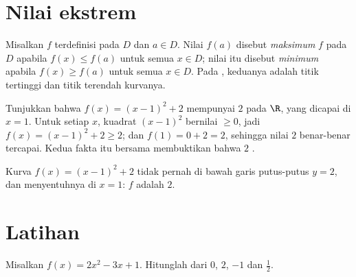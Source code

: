 \section{Nilai ekstrem}

\begin{definition}\label{def:g10:functions:extrema}
Misalkan $f$ terdefinisi pada $D$ dan $a \in D$. Nilai $f(a)$ disebut
\emph{maksimum} $f$ pada $D$ apabila $f(x) \leq f(a)$ untuk
semua $x \in D$; nilai itu disebut \emph{minimum} apabila
$f(x) \geq f(a)$ untuk semua $x \in D$. Pada , keduanya adalah titik
tertinggi dan titik terendah kurvanya.
\end{definition}

\begin{example}\label{ex:g10:functions:extremum}
Tunjukkan bahwa $f(x) = (x - 1)^2 + 2$ mempunyai  $2$ pada $\R$, yang
dicapai di $x = 1$. Untuk setiap $x$, kuadrat $(x-1)^2$ bernilai $\geq 0$,
jadi $f(x) = (x-1)^2 + 2 \geq 2$; dan $f(1) = 0 + 2 = 2$, sehingga nilai $2$
benar-benar tercapai. Kedua fakta itu bersama membuktikan bahwa $2$ .
\end{example}

\begin{omfigure}

{\small Kurva $f(x) = (x-1)^2 + 2$ tidak pernah  di bawah garis putus-putus
$y = 2$, dan menyentuhnya di $x = 1$:  $f$ adalah $2$.}
\end{omfigure}

\section{Latihan}

\begin{exercise}[$\star$]\label{exo:g10:functions:1}
Misalkan $f(x) = 2x^2 - 3x + 1$. Hitunglah  dari $0$, $2$, $-1$ dan
$\frac12$.
\end{exercise}

